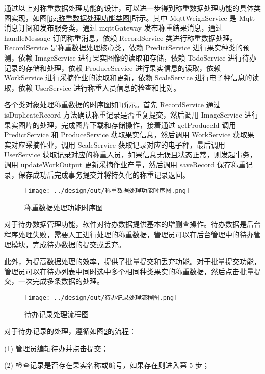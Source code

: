 通过以上对称重数据处理功能的设计，可以进一步得到称重数据处理功能的具体类图实现，如图\ref{fig:称重数据处理功能类图}所示。其中 MqttWeighService 是 Mqtt 消息订阅和发布服务类，通过 mqttGateway 发布称重结果消息，通过 handleMessage 订阅称重消息，依赖 RecordService 类进行称重数据处理。RecordService 是称重数据处理核心类，依赖 PredictService 进行果实种类的预测，依赖 ImageService 进行果实图像的读取和存储，依赖 TodoService 进行待办记录的存储和处理，依赖 ProduceService 进行果实信息的读取，依赖 WorkService 进行采摘作业的读取和更新，依赖 ScaleService 进行电子秤信息的读取，依赖 UserService 进行称重人员信息的检查和比对。

各个类对象处理称重数据的时序图如\ref{fig:称重数据处理功能时序图}所示。首先 RecordService 通过 isDuplicateRecord 方法确认称重记录是否重复提交，然后调用 ImageService 进行果实图片的处理，完成图片下载和存储操作，接着通过 getProduceId 调用 PredictService 和 ProduceService 获取果实信息，然后调用 WorkService 获取果实对应采摘作业，调用 ScaleService 获取记录对应的电子秤，最后调用 UserService 获取记录对应的称重人员，如果信息无误且状态正常，则发起事务，调用 updateWorkOutput 更新采摘作业产量，然后调用 saveRecord 保存称重记录，保存成功后完成事务提交并将持久化的称重记录返回。

\begin{figure}
    \centering
    \texttt{[image: ../design/out/称重数据处理功能时序图.png]}
    \caption{称重数据处理功能时序图}
    \label{fig:称重数据处理功能时序图}
\end{figure}

对于待办数据管理功能，软件对待办数据提供基本的增删查操作。待办数据是后台程序处理失败，需要人工进行处理的称重数据，管理员可以在后台管理中的待办管理模块，完成待办数据的提交或丢弃。

此外，为提高数据处理的效率，提供了批量提交和丢弃功能。对于批量提交功能，管理员可以在待办列表中同时选中多个相同种类果实的称重数据，然后点击批量提交，一次完成多条数据的处理。

\begin{figure}
    \centering
    \texttt{[image: ../design/out/待办记录处理流程图.png]}
    \caption{待办记录处理流程图}
    \label{fig:待办记录处理流程图}
\end{figure}

对于待办记录的处理，遵循如图\ref{fig:待办记录处理流程图}的流程：

(1) 管理员编辑待办并点击提交；

(2) 检查记录是否存在果实名称或编号，如果存在则进入第 5 步；

